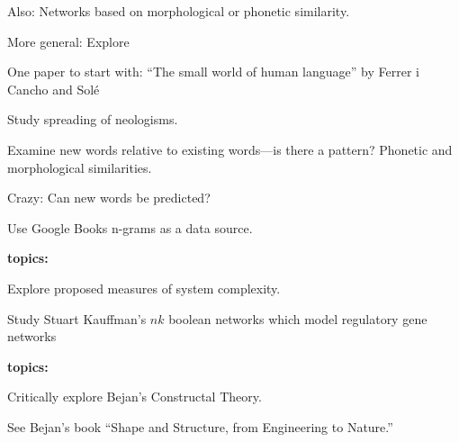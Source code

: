     Also: Networks based on morphological or phonetic similarity.
   
    More general: Explore 
  
    One paper to start with: ``The small world of human language''
    by Ferrer i Cancho and Sol\'{e}\cite{ferrericancho2001a}
   
    Study spreading of
    neologisms.
   
    Examine new words relative to existing words---is there 
    a pattern?  Phonetic and morphological similarities.
   
    \alert{Crazy:} Can new words be predicted?
   
    Use Google Books n-grams as a data source.
  
  



  \textbf{topics:}

    
    
     
      Explore proposed measures of system
      complexity.  
    
    

  
  
  
    Study Stuart Kauffman's \alert{$nk$ boolean
      networks} which model regulatory gene networks\cite{kauffman1993a}
  
  


  \textbf{topics:}

  
    
    
      Critically explore Bejan's Constructal Theory.
    
      See Bejan's book ``Shape and Structure, from Engineering to Nature.''\cite{bejan2000a}
    
